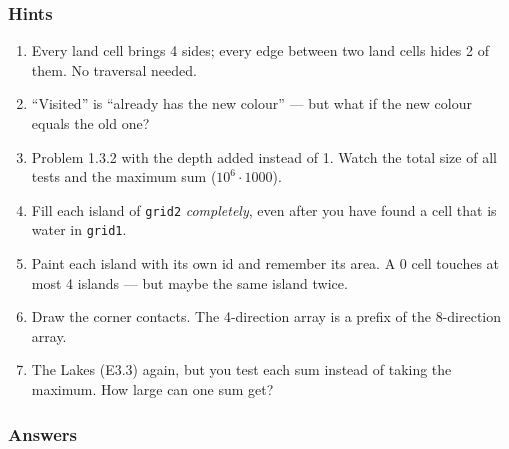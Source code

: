 \subsubsection*{Hints}
\begin{enumerate}[leftmargin=*, label=\textbf{E3.\arabic*}]
    \item Every land cell brings 4 sides; every edge between two land cells hides 2 of them. No traversal needed.
    \item ``Visited'' is ``already has the new colour'' --- but what if the new colour equals the old one?
    \item Problem 1.3.2 with the depth added instead of 1. Watch the total size of all tests and the maximum sum ($10^6\cdot1000$).
    \item Fill each island of \texttt{grid2} \emph{completely}, even after you have found a cell that is water in \texttt{grid1}.
    \item Paint each island with its own id and remember its area. A $0$ cell touches at most 4 islands --- but maybe the same island twice.
    \item Draw the corner contacts. The 4-direction array is a prefix of the 8-direction array.
    \item The Lakes (E3.3) again, but you test each sum instead of taking the maximum. How large can one sum get?
\end{enumerate}

\subsubsection*{Answers}

